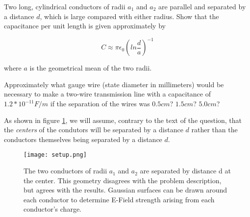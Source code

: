 
\begin{question}
Two long, cylindrical conductors of radii $a_1$ and $a_2$ are parallel
and separated by a distance $d$, which is large compared with either
radius. Show that the capacitance per unit length is given
approximately by

\begin{equation}
  C \approx \pi \epsilon_0 \left( ln \frac d a \right)^{-1}
\end{equation}


where $a$ is the geometrical mean of the two radii.

Approximately what gauge wire (state diameter in millimeters) would be
necessary to make a two-wire transmission line with a capacitance of
$1.2 * 10^{-11} F/m$ if the separation of the wires was $0.5 cm$? $1.5
cm$? $5.0 cm$?
\end{question}

As shown in figure \ref{fig::1::7::setup}, we will assume, contrary to
the text of the question, that the \emph{centers} of the condutors
will be separated by a distance $d$ rather than the conductors
themselves being separated by a distance $d$.

\begin{figure}
  \label{fig::1::7::setup}

\begin{center}

  \texttt{[image: setup.png]}

  \caption{The two conductors of radii $a_1$ and $a_2$ are separated by
    distance d at the center.  This geometry disagrees with the
    problem description, but agrees with the results.  Gaussian
    surfaces can be drawn around each conductor to determine E-Field
    strength arising from each conductor's charge.}

\end{center}
\end{figure}

